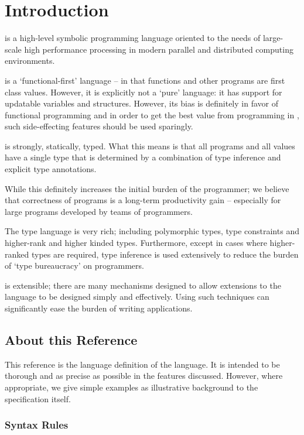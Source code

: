 \chapter{Introduction}
\label{Introduction}

\Sr is a high-level symbolic programming language oriented to the needs of large-scale high performance processing in modern parallel and distributed computing environments.

\Sr is a `functional-first' language -- in that functions and other programs are first class values. However, it is explicitly not a `pure' language: it has support for updatable variables and structures. However, its bias is definitely in favor of functional programming and in order to get the best value from programming in \Sr, such side-effecting features should be used sparingly.

\Sr is strongly, statically, typed. What this means is that all programs and all values have a single type that is determined by a combination of type inference and explicit type annotations.

While this definitely increases the initial burden of the programmer; we believe that correctness of programs is a long-term productivity gain -- especially for large programs developed by teams of programmers.

The type language is very rich; including polymorphic types, type constraints and higher-rank and higher kinded types. Furthermore, except in cases where higher-ranked types are required, type inference is used extensively to reduce the burden of `type bureaucracy' on programmers.

\Sr is extensible; there are many mechanisms designed to allow extensions to the language to be designed simply and effectively. Using such techniques can significantly ease the burden of writing applications.

\section{About this Reference}
This reference is the language definition of the \Sr language. It is intended to be thorough and as precise as possible in the features discussed. However, where appropriate, we give simple examples as illustrative background to the specification itself.

\subsection{Syntax Rules}

